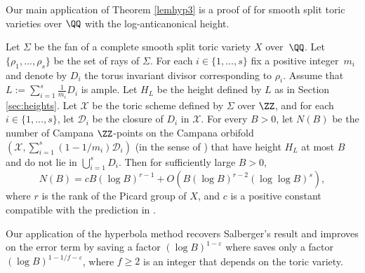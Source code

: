 Our main application of Theorem \ref{lemhyp3} is a proof of \cite[Conj.\,1.1]{PSTVA} for smooth split toric varieties over $\QQ$ with the log-anticanonical height.
\begin{theorem}
\label{thm:toric}
Let $\Sigma$ be the fan of a complete smooth split toric variety $X$ over~$\QQ$. Let $\{\rho_1,\dots,\rho_s\}$ be the set of rays of $\Sigma$.
For each $i\in\{1,\dots,s\}$ fix a positive integer~$m_i$
and denote by $D_i$ the torus invariant divisor corresponding to $\rho_i$. Assume that $L:=\sum_{i=1}^s\frac 1{m_i} D_i$ is ample.
Let $H_L$ be the height defined by $L$ as in Section \ref{sec:heights}.
Let $\mathscr X$ be the toric scheme defined by $\Sigma$ over $\ZZ$, and for each $i\in\{1,\dots,s\}$, let $\mathscr D_i$ be the closure of $D_i$ in $\mathscr X$.
For every $B>0$, let $N(B)$ be the number of Campana $\ZZ$-points on the Campana orbifold $(\mathscr X, \sum_{i=1}^s(1-1/m_i)\mathscr D_i)$ (in the sense of \cite[Def.\,3.4]{PSTVA}) that have height $H_L$ at most $B$ and do not lie in $\bigcup_{i=1}^sD_i$.
Then for sufficiently large $B>0$,
\begin{equation}
\label{eq:mainthm_asympt}
N(B) = c B(\log B)^{r-1} + O(
B(\log B)^{r-2}(\log\log B)^{s}),
\end{equation}
where $r$ is the rank of the Picard group of $X$, and $c$ is a positive constant compatible with the prediction in \cite[\S3.3]{PSTVA}.
\end{theorem}
Our application of the hyperbola method recovers Salberger's result \cite{MR1679841} and improves on the error term by saving a factor $(\log B)^{1-\varepsilon}$ where \cite{MR1679841} saves only a factor $(\log B)^{1-1/f-\varepsilon}$, where $f\geq 2$ is an integer that depends on the toric variety.

